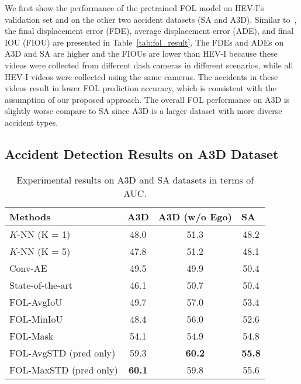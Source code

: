 \documentclass[letterpaper, 10 pt, conference]{ieeeconf}
\theoremstyle{definition}
\theoremstyle{remark}
\begin{document}
We first show the performance of the pretrained FOL model on HEV-I's
validation set and on the other two accident datasets (SA and A3D).
Similar to~\cite{yao2018egocentric}, 
the final displacement error (FDE), 
average displacement error (ADE), and final IOU (FIOU) are presented 
in Table~\ref{tab:fol_result}. The FDEs and ADEs on A3D 
and SA are higher and the FIOUs are lower than HEV-I because these 
videos were collected 
from different dash cameras in different scenarios, while all HEV-I 
videos were collected using the same cameras. 
The accidents in these videos result in 
lower FOL prediction accuracy, which is consistent with the 
assumption of our proposed approach.
The overall FOL performance on A3D is slightly 
worse compare to SA since A3D is a larger dataset with more diverse 
accident types.

\subsection{Accident Detection Results on A3D Dataset}

\begin{table}[t]
    \vspace{5pt}
    \centering
    \renewcommand{\arraystretch}{1.3}
    \caption{Experimental results on A3D and SA datasets in terms of AUC.}
    \label{tab:results}
    \begin{tabular}{lccc}
        \toprule
        Methods & A3D & A3D (w/o Ego) & SA~\cite{chan2016anticipating} \\
        \midrule
$K$-NN (K = 1)  & 48.0 & 51.3 & 48.2 \\
        $K$-NN (K = 5)  & 47.8 & 51.2 & 48.1 \\
        Conv-AE\cite{hasan2016learning} & 49.5 & 49.9 & 50.4 \\
        State-of-the-art~\cite{liu2018future}  & 46.1  & 50.7 & 50.4 \\
        \midrule
        FOL-AvgIoU   & 49.7 & 57.0 & 53.4  \\
        FOL-MinIoU   & 48.4 & 56.0 & 52.6 \\
        FOL-Mask  & 54.1 & 54.9 & 54.8 \\
        FOL-AvgSTD (pred only)   & 59.3 & \textbf{60.2} & \textbf{55.8} \\
        FOL-MaxSTD (pred only)   & \textbf{60.1} & 59.8 & 55.6 \\
        \bottomrule
    \end{tabular}
    \vspace{-10pt}
\end{table}
\end{document}
